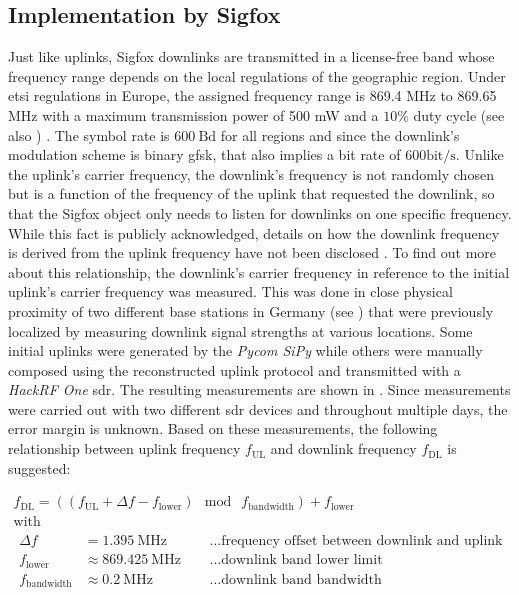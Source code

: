 \subsection{Implementation by Sigfox}
Just like uplinks, Sigfox downlinks are transmitted in a license-free band whose frequency range depends on the local regulations of the geographic region.
Under \gls{etsi} regulations in Europe, the assigned frequency range is 869.4 MHz to 869.65 MHz with a maximum transmission power of 500 mW and a $10\%$ duty cycle (see also ) \cite[Section 5.2.1]{sigfox_ietf}.
The symbol rate is $600 ~ \mathrm{Bd}$ for all regions and since the downlink's modulation scheme is binary \gls{gfsk}, that also implies a bit rate of $600 \mathrm{bit} / \mathrm{s}$.
Unlike the uplink's carrier frequency, the downlink's frequency is not randomly chosen but is a function of the frequency of the uplink that requested the downlink, so that the Sigfox object only needs to listen for downlinks on one specific frequency.
While this fact is publicly acknowledged, details on how the downlink frequency is derived from the uplink frequency have not been disclosed \cite[Section 5.2.1]{sigfox_ietf}.
To find out more about this relationship, the downlink's carrier frequency in reference to the initial uplink's carrier frequency was measured.
This was done in close physical proximity of two different base stations in Germany (see ) that were previously localized by measuring downlink signal strengths at various locations.
Some initial uplinks were generated by the \textit{Pycom SiPy} while others were manually composed using the reconstructed uplink protocol and transmitted with a \textit{HackRF One} \gls{sdr}.
The resulting measurements are shown in .
Since measurements were carried out with two different \gls{sdr} devices and throughout multiple days, the error margin is unknown.
Based on these measurements, the following relationship between uplink frequency $f_\text{UL}$ and downlink frequency $f_\text{DL}$ is suggested:

\begin{equation}
\begin{array}{c}
f_\text{DL} = \left( \left( f_\text{UL} + \Delta f - f_\text{lower} \right) ~ \bmod ~ f_\text{bandwidth} \right) + f_\text{lower} \\
\text{with} \\
\begin{alignedat}{2}
	\Delta f &= 1.395 ~ \mathrm{MHz} & & ~~ \ldots \text{frequency offset between downlink and uplink} \\
	f_\text{lower} &\approx 869.425 ~ \mathrm{MHz} & & ~~ \ldots \text{downlink band lower limit} \\
	f_\text{bandwidth} &\approx 0.2 ~ \mathrm{MHz} & & ~~ \ldots \text{downlink band bandwidth}
\end{alignedat}
\end{array}
\end{equation}

